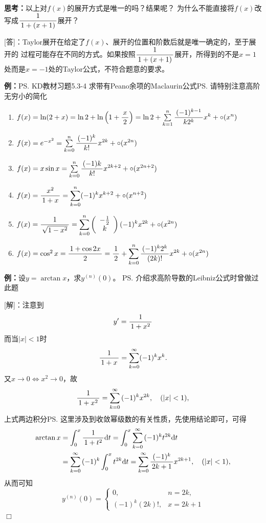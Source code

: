 {\bf 思考：}以上对$f(x)$的展开方式是唯一的吗？结果呢？
为什么不能直接将$f(x)$改写成$\displaystyle\frac{\,{1}\,}{\,{1+(x+1)}\,}$展开？

[答]：Taylor展开在给定了$f(x)$、展开的位置和阶数后就是唯一确定的，至于展开的
过程可能存在不同的方式。如果按照$\displaystyle\frac{\,{1}\,}{\,{1+(x+1)}\,}$展开，所得到的不是$x=1$
处而是$x=-1$处的Taylor公式，不符合题意的要求。

{\bf 例：}\ps{KD教材习题5.3-4}
求带有Peano余项的Maclaurin公式\ps{请特别注意高阶无穷小的简化}
\begin{enumerate}[(1)]
  \setlength{\itemindent}{1cm}
  \item $f(x)=\ln(2+x)=\ln2+\ln\left(1+\displaystyle\frac{\,{x}\,}{\,{2}\,}\right)
  =\ln2+\sum\limits_{k=1}^n\displaystyle\frac{\,{(-1)^{k-1}}\,}{\,{k2^k}\,}x^k+\circ(x^n)$ 
  \item $f(x)=e^{-x^2}=\sum\limits_{k=0}^n\displaystyle\frac{\,{(-1)^k}\,}{\,{k!}\,}x^{2k}
  +\circ(x^{2n})$
  \item $f(x)=x\sin x=\sum\limits_{k=0}^{n}\displaystyle\frac{\,{(-1)k}\,}{\,{k!}\,}x^{2k+2}
  +\circ(x^{2n+2})$ 
  \item $f(x)=\displaystyle\frac{\,{x^2}\,}{\,{1+x}\,}=\sum\limits_{k=0}^n(-1)^kx^{k+2}
  +\circ(x^{n+2})$ 
  \item $f(x)=\displaystyle\frac{\,{1}\,}{\,{\sqrt{1-x^2}}\,}=\sum\limits_{k=0}^n\left(
  \begin{array}{c}
  -\frac12\\ k
  \end{array}\right)(-1)^kx^{2k}+\circ(x^{2n})$ 
  \item $f(x)=\cos^2x=\displaystyle\frac{\,{1+\cos2x}\,}{\,{2}\,}=\displaystyle\frac{\,{1}\,}{\,{2}\,}+
  \sum\limits_{k=0}^{n}\displaystyle\frac{\,{(-1)^k2^k}\,}{\,{(2k)!}\,}x^{2k}+\circ(x^{2n})$
\end{enumerate}

{\bf 例：}设$y=\arctan x$，求$y^{(n)}(0)$。
\ps{介绍求高阶导数的Leibniz公式时曾做过此题}

[解]：注意到
$$y'=\displaystyle\frac{\,{1}\,}{\,{1+x^2}\,}$$
而当$|x|<1$时
$$\displaystyle\frac{\,{1}\,}{\,{1+x}\,}=\sum\limits_{k=0}^{\infty}(-1)^kx^k.$$
又$x\to0\Leftrightarrow x^2\to0$，故
$$\displaystyle\frac{\,{1}\,}{\,{1+x^2}\,}=\sum\limits_{k=0}^{\infty}{(-1)^k}x^{2k},\quad (|x|<1),$$
上式两边积分\ps{这里涉及到收敛幂级数的有关性质，先使用结论即可}，可得
\begin{align*}
	\arctan x&=\displaystyle\int_0^x\displaystyle\frac{\,{1}\,}{\,{1+t^2}\,}\mathrm{d} t
	=\displaystyle\int_0^x\sum\limits_{k=0}^{\infty}{(-1)^k}t^{2k}\mathrm{d} t\\
	&=\sum\limits_{k=0}^{\infty}{(-1)^k}\displaystyle\int_0^xt^{2k}\mathrm{d} t
	=\sum\limits_{k=0}^{\infty}\displaystyle\frac{\,{(-1)^k}\,}{\,{2k+1}\,}x^{2k+1},
	\quad (|x|<1),
\end{align*}
从而可知
$$y^{(n)}(0)=\left\{\begin{array}{ll}
0,& n=2k,\\ {(-1)^k}(2k)!,& x=2k+1
\end{array}\right.$$
\hfill$\Box$

